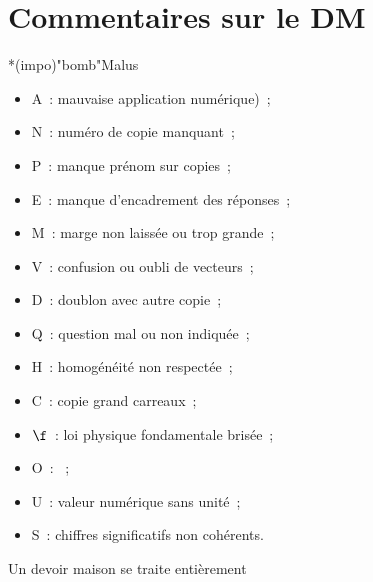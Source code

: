 \documentclass[a4paper, 12pt, final, garamond]{book}
\begin{document}
\setcounter{chapter}{-1}

\chapter{Commentaires sur le DM}

\begin{tcb}*(impo)"bomb"{Malus}
	\begin{minipage}{0.50\linewidth}
		\begin{itemize}
			\item A~: mauvaise application numérique)~;
			\item N~: numéro de copie manquant~;
			\item P~: manque prénom sur copies~;
			\item E~: manque d'encadrement des réponses~;
			\item M~: marge non laissée ou trop grande~;
			\item V~: confusion ou oubli de vecteurs~;
			\item D~: doublon avec autre copie~;
		\end{itemize}
	\end{minipage}
	\begin{minipage}{0.50\linewidth}
		\begin{itemize}
			\item Q~: question mal ou non indiquée~;
			\item H~: homogénéité non respectée~;
			\item C~: copie grand carreaux~;
			\item $\f$~: loi physique fondamentale brisée~;
			\item O~: ~;
			\item U~: valeur numérique sans unité~;
			\item S~: chiffres significatifs non cohérents.
		\end{itemize}
	\end{minipage}
\end{tcb}

\begin{center}
	\Huge Un devoir maison se traite entièrement
\end{center}
\end{document}
